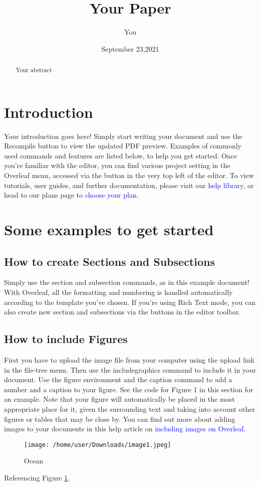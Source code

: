 \documentclass{article}
\title{Your Paper}
\author{You}
\date{September 23,2021}
\begin{document}
	\maketitle
	\begin{abstract}
		Your abstract
	\end{abstract}
	\section{Introduction}
	Your introduction goes here! Simply start writing your document and use the Recompile button to
	view the updated PDF preview. Examples of commonly used commands and features are listed below,
	to help you get started.
	Once you’re familiar with the editor, you can find various project setting in the Overleaf menu,
	accessed via the button in the very top left of the editor. To view tutorials, user guides, and further
	documentation, please visit our \textcolor{blue}{help library}, or head to our plans page to \textcolor{blue}{choose your plan.}
	\section{Some examples to get started}
	\subsection{How to create Sections and Subsections}
	Simply use the section and subsection commands, as in this example document! With Overleaf, all
	the formatting and numbering is handled automatically according to the template you’ve chosen. If
	you’re using Rich Text mode, you can also create new section and subsections via the buttons in the
	editor toolbar.
	\subsection{How to include Figures}
	First you have to upload the image file from your computer using the upload link in the file-tree menu.
	Then use the includegraphics command to include it in your document. Use the figure environment
	and the caption command to add a number and a caption to your figure. See the code for Figure 1 in
	this section for an example.
	Note that your figure will automatically be placed in the most appropriate place for it, given the
	surrounding text and taking into account other figures or tables that may be close by. You can find
	out more about adding images to your documents in this help article on \textcolor{blue}{including images on Overleaf.}
	\begin{figure}[htbp]
		\centering
		\texttt{[image: /home/user/Downloads/image1.jpeg]}
		\caption{Ocean}\label{Figure:1}
	\end{figure}
	Referencing Figure \ref{Figure:1}.
\end{document}
